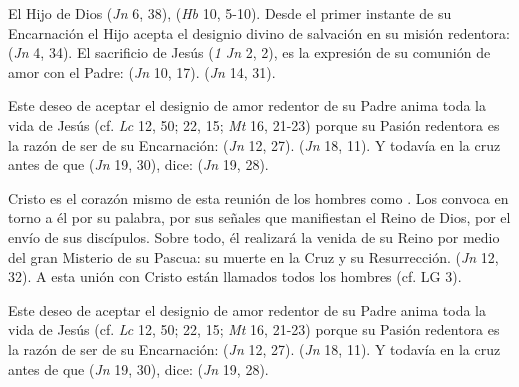 \begin{ccebody}

 El Hijo de Dios  (\textit{Jn} 6, 38),  (\textit{Hb} 10, 5-10). Desde el primer instante de su Encarnación el Hijo acepta el designio divino de salvación en su misión redentora:  (\textit{Jn} 4, 34). El sacrificio de Jesús  (\textit{1 Jn} 2, 2), es la expresión de su comunión de amor con el Padre:  (\textit{Jn} 10, 17).  (\textit{Jn} 14, 31).

 Este deseo de aceptar el designio de amor redentor de su Padre anima toda la vida de Jesús (cf. \textit{Lc} 12, 50; 22, 15; \textit{Mt} 16, 21-23) porque su Pasión redentora es la razón de ser de su Encarnación:  (\textit{Jn} 12, 27).  (\textit{Jn} 18, 11). Y todavía en la cruz antes de que  (\textit{Jn} 19, 30), dice:  (\textit{Jn} 19, 28).
\end{ccebody}


\begin{ccebody}
 Cristo es el corazón mismo de esta reunión de los hombres como . Los convoca en torno a él por su palabra, por sus señales que manifiestan el Reino de Dios, por el envío de sus discípulos. Sobre todo, él realizará la venida de su Reino por medio del gran Misterio de su Pascua: su muerte en la Cruz y su Resurrección.  (\textit{Jn} 12, 32). A esta unión con Cristo están llamados todos los hombres (cf. LG 3).

 Este deseo de aceptar el designio de amor redentor de su Padre anima toda la vida de Jesús (cf. \textit{Lc} 12, 50; 22, 15; \textit{Mt} 16, 21-23) porque su Pasión redentora es la razón de ser de su Encarnación:  (\textit{Jn} 12, 27).  (\textit{Jn} 18, 11). Y todavía en la cruz antes de que  (\textit{Jn} 19, 30), dice:  (\textit{Jn} 19, 28).
\end{ccebody}

